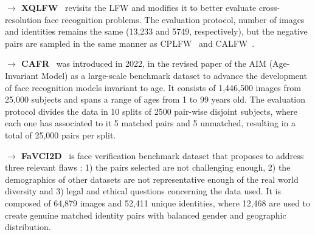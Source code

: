 \documentclass[class=report, crop=false, a4paper, 12pt]{standalone}
\begin{document}
\vspace{0.7\baselineskip}
\noindent\textbf{$\rightarrow$ XQLFW}~\autocite{knocheCrossQualityLFWDatabase2021} revisits the LFW and modifies it to better evaluate cross-resolution face recognition problems. The evaluation protocol, number of images and identities remains the same (13,233 and 5749, respectively), but the negative pairs are sampled in the same manner as CPLFW~\autocite{zhengCrossPoseLFWDatabase} and CALFW~\autocite{zhengCrossAgeLFWDatabase2017}.

\vspace{0.7\baselineskip}
\noindent\textbf{$\rightarrow$ CAFR}~\autocite{zhaoAgeInvariantFaceRecognition2022} was introduced in 2022, in the revised paper of the AIM (Age-Invariant Model) as a large-scale benchmark dataset to advance the development of face recognition models invariant to age. It consists of 1,446,500 images from 25,000 subjects and spans a range of ages from 1 to 99 years old. The evaluation protocol divides the data in 10 splits of 2500 pair-wise disjoint subjects, where each one has associated to it 5 matched pairs and 5 unmatched, resulting in a total of 25,000 pairs per split.

\vspace{0.7\baselineskip}
\noindent\textbf{$\rightarrow$ FaVCI2D}~\autocite{popescuFaceVerificationChallenging2022} is face verification benchmark dataset that proposes to address three relevant flaws : 1) the pairs selected are not challenging enough,  2) the demographics of other datasets are not representative enough of the real world diversity and 3) legal and ethical questions concerning the data used. It is composed of 64,879 images and 52,411 unique identities, where 12,468 are used to create genuine matched identity pairs with balanced gender and geographic distribution.
\end{document}
